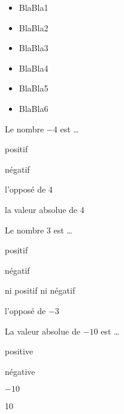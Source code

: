 \begin{acquis}
\begin{itemize}
\item BlaBla1
\item BlaBla2
\item BlaBla3
\item BlaBla4
\item BlaBla5
\item BlaBla6
\end{itemize}
\end{acquis}


\begin{QCM}
  \begin{GroupeQCM}
    \begin{exercice}
      Le nombre $- 4$ est \ldots
      \begin{ChoixQCM}{4}
      \item positif
      \item négatif
      \item l'opposé de 4
      \item la valeur absolue de 4
      \end{ChoixQCM}
\begin{corrige}
   \end{corrige}
    \end{exercice}
    
    
    \begin{exercice}
      Le nombre 3 est \ldots
      \begin{ChoixQCM}{4}
      \item positif
      \item négatif
      \item ni positif ni négatif
      \item l'opposé de $- 3$
      \end{ChoixQCM}
\begin{corrige}
   \end{corrige}
    \end{exercice}


    \begin{exercice}
      La valeur absolue de $- 10$ est \ldots
      \begin{ChoixQCM}{4}
      \item positive
      \item négative
      \item $- 10$
      \item 10
      \end{ChoixQCM}
\begin{corrige}
   \end{corrige}
    \end{exercice}



\end{GroupeQCM}
\end{QCM}
